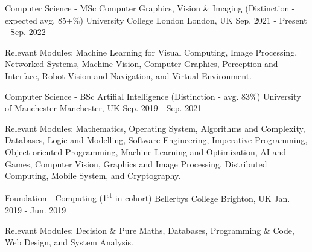 

\begin{cventries}

  \cventry
    {Computer Science - MSc Computer Graphics, Vision \& Imaging (Distinction - expected avg. 85+\%)} %
    {University College London} %
    {London, UK} %
    {Sep. 2021 - Present - Sep. 2022} %
    {
      \begin{cvitems} %
        \item {Relevant Modules: Machine Learning for Visual Computing, Image Processing, Networked Systems, Machine Vision, Computer Graphics, Perception and Interface, Robot Vision and Navigation, and Virtual Environment.}
      \end{cvitems}
    }
    
  \cventry
    {Computer Science - BSc Artifial Intelligence (Distinction - avg. 83\%)} %
    {University of Manchester} %
    {Manchester, UK} %
    {Sep. 2019 - Sep. 2021} %
    {
      \begin{cvitems} %
        \item {Relevant Modules: Mathematics, Operating System, Algorithms and Complexity, Databases, Logic and Modelling, Software Engineering, Imperative Programming, Object-oriented Programming, Machine Learning and Optimization, AI and Games,  Computer Vision, Graphics and Image Processing, Distributed Computing, Mobile System, and Cryptography.}
      \end{cvitems}
    }
    
    \cventry
    {Foundation - Computing (1\textsuperscript{st} in cohort)} %
    {Bellerbys College} %
    {Brighton, UK} %
    {Jan. 2019 - Jun. 2019} %
    {
     \begin{cvitems} %
        \item {Relevant Modules: Decision \& Pure Maths, Databases, Programming \& Code, Web Design, and System Analysis.}
      \end{cvitems}
    }
    

\end{cventries}
